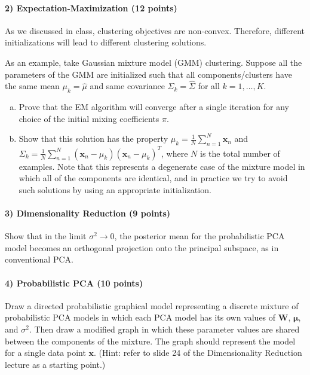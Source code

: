 \documentclass[11pt]{article}
\begin{document}
\paragraph{2) Expectation-Maximization (12 points)} 

As we discussed in class, clustering objectives are non-convex. Therefore, different initializations will lead to different clustering solutions.

As an example, take Gaussian mixture model (GMM) clustering. Suppose all the parameters of the GMM are initialized such that all components/clusters have the same mean $\mu_k=\hat{\mu}$ and same covariance $\Sigma_k=\hat{\Sigma}$ for all $k=1,\ldots,K$.
\begin{enumerate}[(a)]
\item Prove that the EM
algorithm will converge after a single iteration for any choice of the initial mixing coefficients $\pi$.
\item Show that this solution has the property $\mu_k=\frac{1}{N}\sum_{n=1}^{N}\mathbf{x}_n$ and $\Sigma_k=\frac{1}{N}\sum_{n=1}^{N}(\mathbf{x}_n-\mu_k)(\mathbf{x}_n-\mu_k)^T$, where $N$ is the total number of examples. Note that this represents a degenerate case of the mixture model in which all of the components are identical, and in practice we try to avoid such solutions by using an appropriate initialization.
\end{enumerate}

\paragraph{3) Dimensionality Reduction (9 points)}

Show that in the limit $\sigma^2 \rightarrow 0$, the posterior mean for the probabilistic PCA model becomes an orthogonal projection onto the principal subspace, as in conventional PCA.
	

\paragraph{4) Probabilistic PCA (10 points)}

Draw a directed probabilistic graphical model representing a discrete mixture of probabilistic PCA models in which each PCA model has its own values of $\mathbf{W}$, $\boldsymbol{\mu}$, and $\sigma^2$. Then draw a modified graph in which these parameter values are shared between the components of the mixture. The graph should represent the model for a single data point $\mathbf{x}$. (Hint: refer to slide 24 of the Dimensionality Reduction lecture as a starting point.)
	
\end{document}
